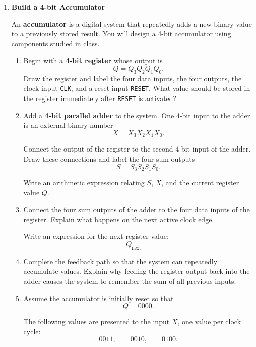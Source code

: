 \documentclass{article}
\begin{document}
\begin{enumerate}
\item \textbf{Build a 4-bit Accumulator}

An \textbf{accumulator} is a digital system that repeatedly adds a new
binary value to a previously stored result. You will design a 4-bit
accumulator using components studied in class.

\begin{enumerate}

\item Begin with a \textbf{4-bit register} whose output is
\[
Q = Q_3Q_2Q_1Q_0.
\]
Draw the register and label the four data inputs, the four outputs, the
clock input \texttt{CLK}, and a reset input \texttt{RESET}. What value
should be stored in the register immediately after \texttt{RESET} is
activated?

\vspace{3.5cm}

\item Add a \textbf{4-bit parallel adder} to the system. One 4-bit
input to the adder is an external binary number
\[
X = X_3X_2X_1X_0.
\]

Connect the output of the register to the second 4-bit input of the
adder. Draw these connections and label the four sum outputs
\[
S = S_3S_2S_1S_0.
\]

Write an arithmetic expression relating $S$, $X$, and the current
register value $Q$.

\vspace{3.0cm}

\item Connect the four sum outputs of the adder to the four data
inputs of the register. Explain what happens on the next active clock
edge.

Write an expression for the next register value:
\[
Q_{\mathrm{next}} =
\]

\vspace{2.5cm}

\item Complete the feedback path so that the system can repeatedly
accumulate values. Explain why feeding the register output back into
the adder causes the system to remember the sum of all previous inputs.

\vspace{3.0cm}

\item Assume the accumulator is initially reset so that
\[
Q = 0000.
\]

The following values are presented to the input $X$, one value per
clock cycle:
\[
0011,\qquad 0010,\qquad 0100.
\]


\end{enumerate}
\end{enumerate}
\end{document}
